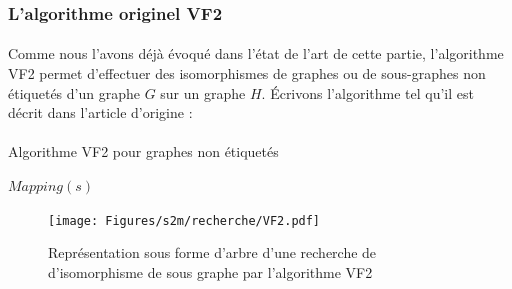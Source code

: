 \documentclass[12pt,french,twoside]{report}
\begin{document}
\subsubsection{L'algorithme originel VF2}

\label{VF2_p}

\paragraph{}Comme nous l'avons déjà évoqué dans l'état de l'art de cette partie, l'algorithme VF2 permet d'effectuer des
isomorphismes de graphes ou de sous-graphes non étiquetés d'un graphe $G$ sur un graphe $H$.
Écrivons l'algorithme tel qu'il est décrit dans l'article d'origine :

\paragraph{}
  \begin{algorithm}[H]
    \caption{Algorithme VF2 pour graphes non étiquetés}
    
     {
      \KwRet $Mapping(s)$\;
    } 
  \end{algorithm}

\begin{figure}[!ht]
  \texttt{[image: Figures/s2m/recherche/VF2.pdf]}
  \caption{\label{vf2}Représentation sous forme d'arbre d'une recherche de d'isomorphisme de sous graphe par l'algorithme VF2}
\end{figure}
\end{document}
